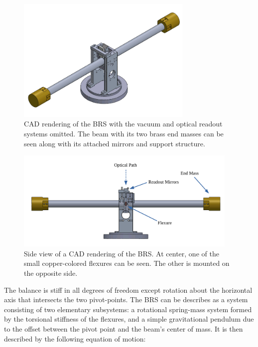 \documentclass [12pt, proquest]{uwthesis}[2019]
\begin{document}
\begin{figure}
\begin{center} \includegraphics[width=0.75\textwidth]{BRSIso.png}
\caption[CAD rendering of the BRS]{CAD rendering of the BRS with the vacuum and optical readout systems omitted. The beam with its two brass end masses can be seen along with its attached mirrors and support structure. }
\end{center}
\end{figure} 
\begin{figure}
\begin{center} 
\includegraphics[width=0.95\textwidth]{BRSFrontLabeled.pdf}
\end{center}
\caption[Side view of a CAD rendering of the BRS]{Side view of a CAD rendering of the BRS. At center, one of the small copper-colored flexures can be seen. The other is mounted on the opposite side.}
\label{BRSImage}
\end{figure}


The balance is stiff in all degrees of freedom except rotation about the horizontal axis that intersects the two pivot-points. The BRS can be describes as a system consisting of two elementary subsystems: a rotational spring-mass system formed by the torsional stiffness of the flexures, and a simple gravitational pendulum due to the offset between the pivot point and the beam's center of mass. It is then described by the following equation of motion:~\cite{venk2014}
\end{document}
